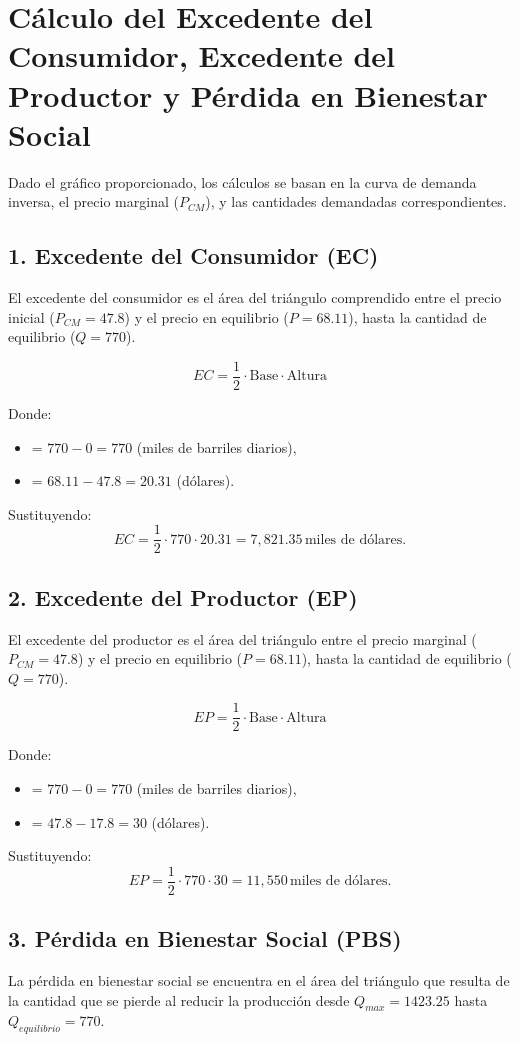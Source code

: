 \documentclass{article}
\begin{document}
\section*{Cálculo del Excedente del Consumidor, Excedente del Productor y Pérdida en Bienestar Social}

Dado el gráfico proporcionado, los cálculos se basan en la curva de demanda inversa, el precio marginal ($P_{CM}$), y las cantidades demandadas correspondientes.

\subsection*{1. Excedente del Consumidor (EC)}
El excedente del consumidor es el área del triángulo comprendido entre el precio inicial ($P_{CM} = 47.8$) y el precio en equilibrio ($P = 68.11$), hasta la cantidad de equilibrio ($Q = 770$). 

\[
EC = \frac{1}{2} \cdot \text{Base} \cdot \text{Altura}
\]

Donde:
\begin{itemize}
    \item {} = $770 - 0 = 770$ (miles de barriles diarios),
    \item {} = $68.11 - 47.8 = 20.31$ (dólares).
\end{itemize}

Sustituyendo:
\[
EC = \frac{1}{2} \cdot 770 \cdot 20.31 = 7,821.35 \, \text{miles de dólares}.
\]

\subsection*{2. Excedente del Productor (EP)}
El excedente del productor es el área del triángulo entre el precio marginal ($P_{CM} = 47.8$) y el precio en equilibrio ($P = 68.11$), hasta la cantidad de equilibrio ($Q = 770$). 

\[
EP = \frac{1}{2} \cdot \text{Base} \cdot \text{Altura}
\]

Donde:
\begin{itemize}
    \item {} = $770 - 0 = 770$ (miles de barriles diarios),
    \item {} = $47.8 - 17.8 = 30$ (dólares).
\end{itemize}

Sustituyendo:
\[
EP = \frac{1}{2} \cdot 770 \cdot 30 = 11,550 \, \text{miles de dólares}.
\]

\subsection*{3. Pérdida en Bienestar Social (PBS)}
La pérdida en bienestar social se encuentra en el área del triángulo que resulta de la cantidad que se pierde al reducir la producción desde $Q_{max} = 1423.25$ hasta $Q_{equilibrio} = 770$.
\end{document}
